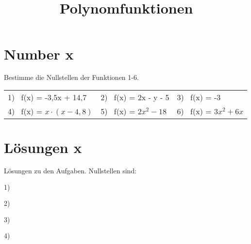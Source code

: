 \documentclass[10pt,a4paper]{article}
\begin{document}
\title{Polynomfunktionen}

\makeatletter
\def\@maketitle{%
  \newpage
  \null
  \vskip 2em%
  \begin{center}%
  \let \footnote \thanks
    {\Huge\bfseries\@title \par}%
    \vskip 1.5em%
    {\large
      \lineskip .5em%
      \begin{tabular}[t]{c}%
        \@author
      \end{tabular}\par}%
    \vskip 1em%
    {\large \@date}%
  \end{center}%
  \par
  \vskip 1.5em}
\makeatother

\author{}
\date{}

\maketitle

\section*{Number x}

Bestimme die Nullstellen der Funktionen 1-6. \newline

\begin{tabular}{l l l}

    1) \ f(x) = -3,5x + 14,7 & 2) \ f(x) = 2x - y - 5 & 3) \ f(x) = -3 \\
    4) \ f(x) = $x \cdot (x - 4,8)$ & 5) \ f(x) = $2x^2 - 18$ & 6) \ f(x) = $3x^2 + 6x$

\end{tabular}

\section*{Lösungen x}

Lösungen zu den Aufgaben. Nullstellen sind: \newline

1)

2)

3)

4)
\end{document}
